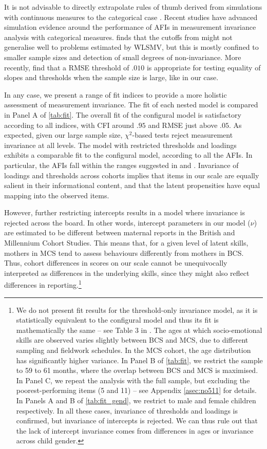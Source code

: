 It is not advisable to directly extrapolate rules of thumb derived from simulations with continuous measures to the categorical case \citet{Lubke2004}. Recent studies have advanced simulation evidence around the performance of AFIs in measurement invariance analysis with categorical measures. \citet{Sass2014} finds that the cutoffs from \citet{Chen2007} might not generalise well to problems estimated by WLSMV, but this is mostly confined to smaller sample sizes and detection of small degrees of non-invariance. More recently, \citet{Rutkowski2017} find that a \textDelta RMSE threshold of $.010$ is appropriate for testing equality of slopes and thresholds when the sample size is large, like in our case. 

In any case, we present a range of fit indices to provide a more holistic assessment of measurement invariance. The fit of each nested model is compared in Panel A of \autoref{tab:fit}. The overall fit of the configural model is satisfactory according to all indices, with CFI around $.95$ and RMSE just above $.05$. As expected, given our large sample size, $\chi^2$-based tests reject measurement invariance at all levels. The model with restricted thresholds and loadings exhibits a comparable fit to the configural model, according to all the AFIs. In particular, the \textDelta AFIs fall within the ranges suggested in \citet{Chen2007} and \citet{Rutkowski2017}. Invariance of loadings and thresholds across cohorts implies that items in our scale are equally salient in their informational content, and that the latent propensities have equal mapping into the observed items. 

However, further restricting intercepts results in a model where invariance is rejected across the board. In other words, intercept parameters in our model ($\nu$) are estimated to be different between maternal reports in the British and Millennium Cohort Studies. This means that, for a given level of latent skills, mothers in MCS tend to assess behaviours differently from mothers in BCS. Thus, cohort differences in scores on our scale cannot be unequivocally interpreted as differences in the underlying skills, since they might also reflect differences in reporting.\footnote{We do not present fit results for the threshold-only invariance model, as it is statistically equivalent to the configural model and thus its fit is mathematically the same -- see Table 3 in \citealp{Wu2016a}. The ages at which socio-emotional skills are observed varies slightly between BCS and MCS, due to different sampling and fieldwork schedules. In the MCS cohort, the age distribution has significantly higher variance. In Panel B of \autoref{tab:fit}, we restrict the sample to 59 to 61 months, where the overlap between BCS and MCS is maximised. In Panel C, we repeat the analysis with the full sample, but excluding the poorest-performing items (5 and 11) -- see Appendix \autoref{asec:no511} for details. In Panels A and B of \autoref{tab:fit_gend}, we restrict to male and female children respectively. In all these cases, invariance of thresholds and loadings is confirmed, but invariance of intercepts is rejected. We can thus rule out that the lack of intercept invariance comes from differences in ages or invariance across child gender.}

